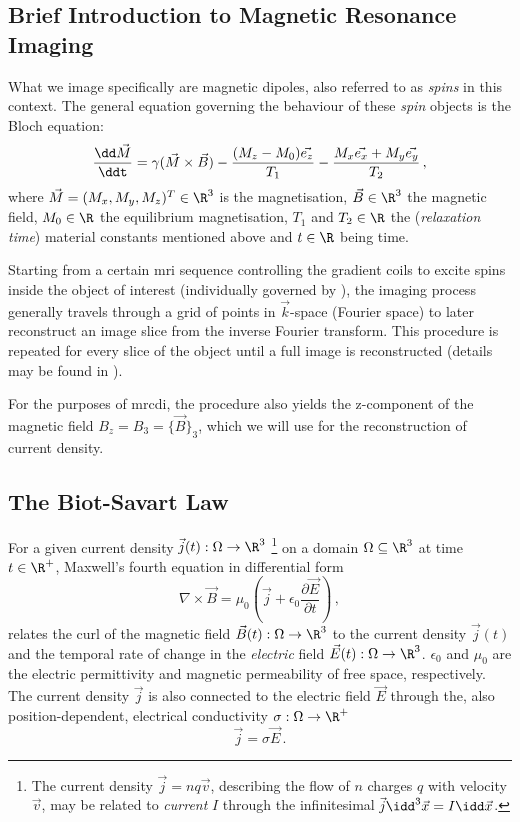 \documentclass[10pt]{article}
\begin{document}
  \subsection{Brief Introduction to Magnetic Resonance Imaging}
  What we image specifically are magnetic dipoles, also referred to as \textit{spins} in this context.
  The general equation governing the behaviour of these \textit{spin} objects is the Bloch equation:
  \begin{equation}
    \frac{\dd \vec{M}}{\ddt} = \gamma (\vec{M} \times \vec{B}) - \frac{(M_z - M_0) \vec{e_z}}{T_1} - \frac{M_x \vec{e_x} + M_y \vec{e_y}}{T_2}\,,
    \label{eq:bloch}
  \end{equation}
  where $\vec{M} = (M_x, M_y, M_z)^T \in \R^3$ is the magnetisation, $\vec{B} \in \R^3$ the magnetic field, $M_0 \in \R$ the equilibrium magnetisation, $T_1$ and $T_2 \in \R$ the (\textit{relaxation time}) material constants mentioned above and $t \in \R$ being time.

  Starting from a certain \gls{mri} sequence controlling the gradient coils to excite spins inside the object of interest (individually governed by ), the imaging process generally travels through a grid of points in $\vec{k}$-space (Fourier space) to later reconstruct an image slice from the inverse Fourier transform.
  This procedure is repeated for every slice of the object until a full image is reconstructed (details may be found in \cite{1996-mri-basics}).

  For the purposes of \gls{mrcdi}, the procedure also yields the z-component of the magnetic field $B_z = B_3 = \{\vec{B}\}_3$, which we will use for the reconstruction of current density.

  \subsection{The Biot-Savart Law}
  For a given current density $\vec{j}(t): \Omega \to \R^3$ \footnote{
    The current density $\vec{j} = nq\vec{v}$, describing the flow of $n$ charges $q$ with velocity $\vec{v}$, may be related to \textit{current} $I$ through the infinitesimal $\vec{j} \idd^3\vec{x} = I \idd\vec{x}$.
  } on a domain $\Omega \subseteq \R^3$ at time $t \in \R^+$, Maxwell's fourth equation in differential form
  \begin{equation*}
    \nabla \times \vec{B} = \mu_0 \left(\vec{j} + \epsilon_0 \frac{\partial \vec{E}}{\partial t}\right)\,,
    \label{eq:maxwell-4}
  \end{equation*}
  relates the curl of the magnetic field $\vec{B}(t): \Omega \to \R^3$ to the current density $\vec{j}(t)$ and the temporal rate of change in the \textit{electric} field $\vec{E}(t): \Omega \to \R^3$.
  $\epsilon_0$ and $\mu_0$ are the electric permittivity and magnetic permeability of free space, respectively.
  The current density $\vec{j}$ is also connected to the electric field $\vec{E}$ through the, also position-dependent, electrical conductivity $\sigma: \Omega \to \R^+$
  $$\vec{j} = \sigma \vec{E}\,.$$
\end{document}
